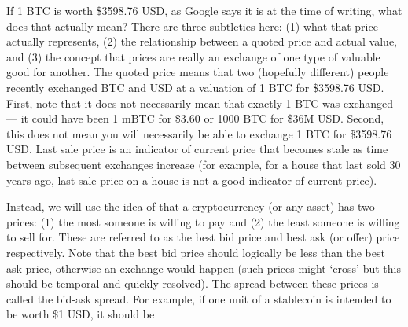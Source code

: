 If 1 BTC is worth \$3598.76 USD, as Google says it is at the time of writing, what does that actually mean? There are three subtleties here: (1) what that price actually represents, (2) the relationship between a quoted price and actual value, and (3) the concept that prices are really an exchange of one type of valuable good for another. The quoted price means that two (hopefully different) people recently exchanged BTC and USD at a valuation of 1 BTC for \$3598.76 USD. First, note that it does not necessarily mean that exactly 1 BTC was exchanged --- it could have been 1 mBTC for \$3.60 or 1000 BTC for \$36M USD. Second, this does not mean you will necessarily be able to exchange 1 BTC for \$3598.76 USD. Last sale price is an indicator of current price that becomes stale as time between subsequent exchanges increase (for example, for a house that last sold 30 years ago, last sale price on a house is not a good indicator of current price).

Instead, we will use the idea of that a cryptocurrency (or any asset) has two prices: (1) the most someone is willing to pay and (2) the least someone is willing to sell for. These are referred to as the best bid price and best ask (or offer) price respectively. Note that the best bid price should logically be less than the best ask price, otherwise an exchange would happen (such prices might `cross' but this should be temporal and quickly resolved). The spread between these prices is called the bid-ask spread. For example, if one unit of a stablecoin is intended to be worth \$1 USD, it should be  




